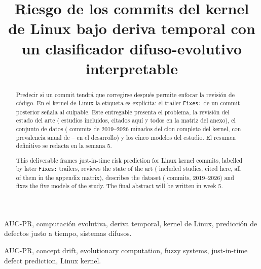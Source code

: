 \documentclass[conference,letterpaper]{IEEEtran}
\renewcommand{\IEEEkeywordsname}{Palabras clave}
\begin{document}
\title{Riesgo de los commits del kernel de Linux bajo deriva temporal con un clasificador difuso-evolutivo interpretable}

\author{
}

\maketitle

\begin{abstract}
Predecir si un commit tendrá que corregirse después permite enfocar la revisión de código. En el kernel de Linux la etiqueta es explícita: el trailer \texttt{Fixes:} de un commit posterior señala al culpable. Este entregable presenta el problema, la revisión del estado del arte (\nTotalIncluidos{} estudios incluidos, \nIncluidosCitados{} citados aquí y todos en la matriz del anexo), el conjunto de datos (\cifCommits{} commits de 2019--2026 minados del clon completo del kernel, con prevalencia anual de \cifPrevMin{}--\cifPrevMax{} en el desarrollo) y los cinco modelos del estudio. El resumen definitivo se redacta en la semana 5.
\end{abstract}

\begingroup\renewcommand{\abstractname}{Abstract}
\begin{abstract}
This deliverable frames just-in-time risk prediction for Linux kernel commits, labelled by later \texttt{Fixes:} trailers, reviews the state of the art (\nTotalIncluidos{} included studies, \nIncluidosCitados{} cited here, all of them in the appendix matrix), describes the dataset (\cifCommits{} commits, 2019--2026) and fixes the five models of the study. The final abstract will be written in week 5.
\end{abstract}\endgroup

\begin{IEEEkeywords}
AUC-PR, computación evolutiva, deriva temporal, kernel de Linux, predicción de defectos justo a tiempo, sistemas difusos.
\end{IEEEkeywords}

\begingroup\renewcommand{\IEEEkeywordsname}{Index Terms}
\begin{IEEEkeywords}
AUC-PR, concept drift, evolutionary computation, fuzzy systems, just-in-time defect prediction, Linux kernel.
\end{IEEEkeywords}\endgroup
\end{document}
